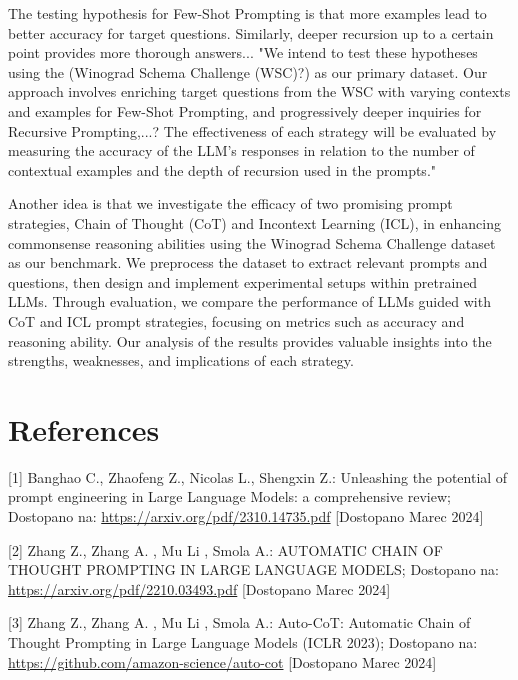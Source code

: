 \documentclass{article}
\begin{document}
The testing hypothesis for Few-Shot Prompting is that more examples lead to better accuracy for target questions. Similarly, deeper recursion up to a certain point provides more thorough answers...
"We intend to test these hypotheses using the (Winograd Schema Challenge (WSC)?) as our primary dataset. Our approach involves enriching target questions from the WSC with varying contexts and examples for Few-Shot Prompting, and progressively deeper inquiries for Recursive Prompting,...? The effectiveness of each strategy will be evaluated by measuring the accuracy of the LLM’s responses in relation to the number of contextual examples and the depth of recursion used in the prompts."\par

Another idea is that we investigate the efficacy of two promising prompt strategies, Chain of Thought (CoT) and Incontext Learning (ICL), in enhancing commonsense reasoning abilities using the Winograd Schema Challenge dataset as our benchmark. We preprocess the dataset to extract relevant prompts and questions, then design and implement experimental setups within pretrained LLMs. Through evaluation, we compare the performance of LLMs guided with CoT and ICL prompt strategies, focusing on metrics such as accuracy and reasoning ability. Our analysis of the results provides valuable insights into the strengths, weaknesses, and implications of each strategy.







\section{References}

[1] Banghao C., Zhaofeng Z., Nicolas L., Shengxin Z.: Unleashing the potential of prompt engineering in Large Language Models: a comprehensive review;
Dostopano na: \url{https://arxiv.org/pdf/2310.14735.pdf} [Dostopano Marec 2024]\newline

[2] Zhang Z., Zhang A. , Mu Li ,  Smola A.: AUTOMATIC CHAIN OF THOUGHT PROMPTING IN LARGE LANGUAGE MODELS;
Dostopano na: \url{https://arxiv.org/pdf/2210.03493.pdf} [Dostopano Marec 2024]\newline

[3] Zhang Z., Zhang A. , Mu Li ,  Smola A.: Auto-CoT: Automatic Chain of Thought Prompting in Large Language Models (ICLR 2023);
Dostopano na: \url{https://github.com/amazon-science/auto-cot} [Dostopano Marec 2024]\newline
\end{document}
